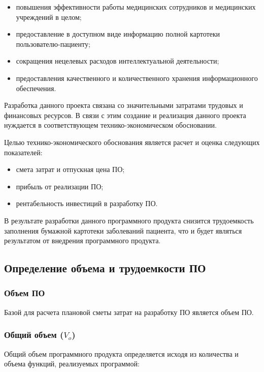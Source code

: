 \begin{itemize}
  \item повышения эффективности работы медицинских сотрудников и медицинских учреждений в целом;
  \item предоставление в доступном виде информацию полной картотеки пользователю-пациенту;
  \item сокращения нецелевых расходов интеллектуальной деятельности;
  \item предоставления качественного и количественного хранения информационного обеспечения.
\end{itemize}

Разработка данного проекта связана со значительными затратами трудовых и финансовых ресурсов. В связи с этим создание и реализация данного проекта нуждается в соответствующем технико-экономическом обосновании.

Целью технико-экономического обоснования является расчет и оценка следующих показателей:

\begin{itemize}
  \item смета затрат и отпускная цена ПО;
  \item прибыль от реализации ПО;
  \item рентабельность инвестиций в разработку ПО.
\end{itemize}

В результате разработки данного программного продукта снизится трудоемкость заполнения бумажной картотеки заболеваний пациента, что и будет являться результатом от внедрения программного продукта.

\subsection{Определение объема и трудоемкости ПО }

\subsubsection{Объем ПО}

Базой для расчета плановой сметы затрат на разработку ПО является объем ПО.   

\subsubsection{Общий объем ($ V_{o} $)}

Общий объем программного продукта определяется исходя из количества и объема функций, реализуемых программой:

